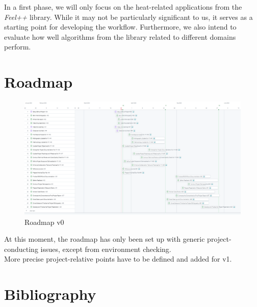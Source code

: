 \documentclass[12pt]{article}
\begin{document}
In a first phase, we will only focus on the heat-related applications from the \textit{Feel++}\cite*{Feel++} library. While it may not be particularly significant to us,
it serves as a starting point for developing the workflow. Furthermore, we also intend to evaluate how well algorithms from the library related to different domains perform.
\newpage
\section{Roadmap}

\vspace{1cm}
\begin{figure}[h]
    \centering
    \includegraphics[width=\textwidth]{../../roadmap/roadmapv0-full.png}
    \caption{Roadmap v0}
    \label{fig:roadmapv0}
\end{figure}
\vspace{1cm}
At this moment, the roadmap has only been set up with generic project-conducting issues,
except from environment checking.\\
More precise project-relative points have to be defined and added for v1.

\newpage
\section{Bibliography}
\nocite{*}
\printbibliography[heading=none]
\end{document}
